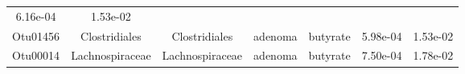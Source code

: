\documentclass[11pt,]{article}
\begin{document}
\begin{longtable}[]{@{}ccccccc@{}}
\begin{minipage}[t]{0.09\columnwidth}
6.16e-04\strut
\end{minipage} & \begin{minipage}[t]{0.09\columnwidth}\centering\strut
1.53e-02\strut
\end{minipage}\tabularnewline
\begin{minipage}[t]{0.09\columnwidth}\centering\strut
Otu01456\strut
\end{minipage} & \begin{minipage}[t]{0.17\columnwidth}\centering\strut
Clostridiales\strut
\end{minipage} & \begin{minipage}[t]{0.17\columnwidth}\centering\strut
Clostridiales\strut
\end{minipage} & \begin{minipage}[t]{0.09\columnwidth}\centering\strut
adenoma\strut
\end{minipage} & \begin{minipage}[t]{0.11\columnwidth}\centering\strut
butyrate\strut
\end{minipage} & \begin{minipage}[t]{0.09\columnwidth}\centering\strut
5.98e-04\strut
\end{minipage} & \begin{minipage}[t]{0.09\columnwidth}\centering\strut
1.53e-02\strut
\end{minipage}\tabularnewline
\begin{minipage}[t]{0.09\columnwidth}\centering\strut
Otu00014\strut
\end{minipage} & \begin{minipage}[t]{0.17\columnwidth}\centering\strut
Lachnospiraceae\strut
\end{minipage} & \begin{minipage}[t]{0.17\columnwidth}\centering\strut
Lachnospiraceae\strut
\end{minipage} & \begin{minipage}[t]{0.09\columnwidth}\centering\strut
adenoma\strut
\end{minipage} & \begin{minipage}[t]{0.11\columnwidth}\centering\strut
butyrate\strut
\end{minipage} & \begin{minipage}[t]{0.09\columnwidth}\centering\strut
7.50e-04\strut
\end{minipage} & \begin{minipage}[t]{0.09\columnwidth}\centering\strut
1.78e-02\strut
\end{minipage}\tabularnewline

\end{longtable}
\end{document}
